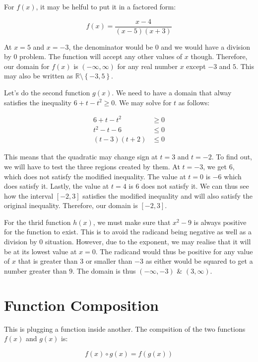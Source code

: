 \documentclass[12pt]{article}
\theoremstyle{definition}
\begin{document}
For $f(x)$, it may be helful to put it in a factored form:

$$
    f(x) = \frac{x - 4}{(x-5)(x+3)}
$$

At $x=5$ and $x=-3$, the denominator would be $0$ and we would have a division by $0$ problem.
The function will accept any other values of $x$ though.
Therefore, our domain for $f(x)$ is $(-\infty, \infty)$ for any real number $x$ except $-3$ and $5$.
This may also be written as $\mathbb{R} \setminus \left\{ -3, 5 \right\}$.


Let's do the second function $g(x)$.
We need to have a domain that alway satisfies the inequality $6 + t - t^2 \geq 0$.
We may solve for $t$ as follows:

\begin{align}
    6 + t - t^2 & \geq 0 \\
    t^2 - t - 6 & \leq 0 \\
    (t-3)(t+2)  & \leq 0
\end{align}

This means that the quadratic may change sign at $t=3$ and $t=-2$.
To find out, we will have to test the three regions created by them.
At $t=-3$, we get $6$, which does not satisfy the modified inequality.
The value at $t=0$ is $-6$ which does satisfy it.
Lastly, the value at $t=4$ is $6$ does not satisfy it.
We can thus see how the interval $[-2, 3]$ satisfies the modified inequality and will also satisfy the original inequality.
Therefore, our domain is $[-2, 3]$.

For the thrid function $h(x)$, we must make sure that $x^2-9$ is always positive for the function to exist.
This is to avoid the radicand being negative as well as a division by $0$ situation.
However, due to the exponent, we may realise that it will be at its lowest value at $x=0$.
The radicand would thus be positive for any value of $x$ that is greater than $3$ or smaller than $-3$ as either would be squared to get a number greater than $9$.
The domain is thus $(-\infty, -3)$ \& $(3, \infty)$.

\section{Function Composition}

This is plugging a function inside another. The compsition of the two functions $f(x)$ and $g(x)$ is:


\begin{equation}
    f(x) \circ g(x) = f(g(x))
\end{equation}
\end{document}
